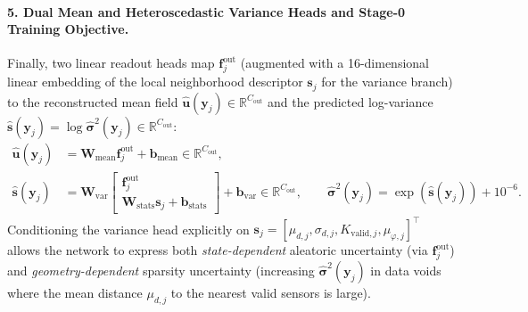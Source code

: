 \paragraph{5. Dual Mean and Heteroscedastic Variance Heads and Stage-0 Training Objective.}
Finally, two linear readout heads map $\mathbf{f}_j^{\text{out}}$ (augmented with a 16-dimensional linear embedding of the local neighborhood descriptor $\mathbf{s}_j$ for the variance branch) to the reconstructed mean field $\hat{\mathbf{u}}(\mathbf{y}_j) \in \mathbb{R}^{C_{\text{out}}}$ and the predicted log-variance $\hat{\mathbf{s}}(\mathbf{y}_j) = \log \hat{\boldsymbol{\sigma}}^2(\mathbf{y}_j) \in \mathbb{R}^{C_{\text{out}}}$:
\begin{align}
    \hat{\mathbf{u}}(\mathbf{y}_j) &= \mathbf{W}_{\text{mean}} \mathbf{f}_j^{\text{out}} + \mathbf{b}_{\text{mean}} \in \mathbb{R}^{C_{\text{out}}}, \label{eq:bg_glu_mean_head} \\
    \hat{\mathbf{s}}(\mathbf{y}_j) &= \mathbf{W}_{\text{var}} \begin{bmatrix} \mathbf{f}_j^{\text{out}} \\ \mathbf{W}_{\text{stats}} \mathbf{s}_j + \mathbf{b}_{\text{stats}} \end{bmatrix} + \mathbf{b}_{\text{var}} \in \mathbb{R}^{C_{\text{out}}}, \qquad \hat{\boldsymbol{\sigma}}^2(\mathbf{y}_j) = \exp\!\left(\hat{\mathbf{s}}(\mathbf{y}_j)\right) + 10^{-6}. \label{eq:bg_glu_var_head}
\end{align}
Conditioning the variance head explicitly on $\mathbf{s}_j = [\mu_{d,j}, \sigma_{d,j}, K_{\text{valid},j}, \mu_{\varphi,j}]^\top$ allows the network to express both \emph{state-dependent} aleatoric uncertainty (via $\mathbf{f}_j^{\text{out}}$) and \emph{geometry-dependent} sparsity uncertainty (increasing $\hat{\boldsymbol{\sigma}}^2(\mathbf{y}_j)$ in data voids where the mean distance $\mu_{d,j}$ to the nearest valid sensors is large).

